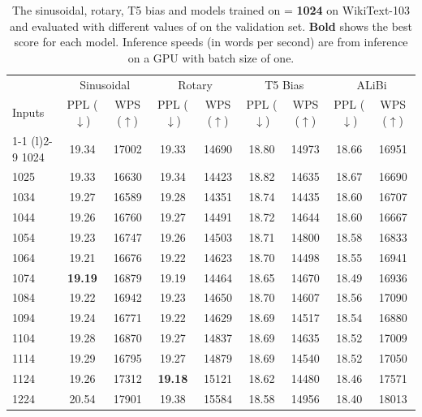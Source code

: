 \begin{table}[]
\small
\caption{The sinusoidal, rotary, T5 bias and \al models  trained on \lt = \textbf{1024} on WikiText-103 and evaluated with different values of \li on the validation set. \textbf{Bold} shows the best score for each model. Inference speeds (in words per second) are from inference on a GPU with batch size of one.}
\label{tab:appendix:wt103_extra_1024}
\begin{center}

\begin{tabular}{@{}lcccccccc@{}} \toprule
 &  \multicolumn{2}{c}{Sinusoidal} & \multicolumn{2}{c}{Rotary} &\multicolumn{2}{c}{T5 Bias} & \multicolumn{2}{c}{ALiBi} \\
Inputs & PPL ($\downarrow$) & WPS ($\uparrow$)& PPL ($\downarrow$) & WPS ($\uparrow$)& PPL ($\downarrow$) & WPS ($\uparrow$)& PPL ($\downarrow$) & WPS ($\uparrow$) \\ \cmidrule(r){1-1} \cmidrule(l){2-9}
1024   & 19.34      & 17002 & 19.33  & 14690 & 18.80   & 14973 & 18.66 & 16951 \\
1025   & 19.33      & 16630 & 19.34  & 14423 & 18.82   & 14635 & 18.67 & 16690 \\
1034   & 19.27      & 16589 & 19.28  & 14351 & 18.74   & 14435 & 18.60 & 16707 \\
1044   & 19.26      & 16760 & 19.27  & 14491 & 18.72   & 14644 & 18.60 & 16667 \\
1054   & 19.23      & 16747 & 19.26  & 14503 & 18.71   & 14800 & 18.58 & 16833 \\
1064   & 19.21      & 16676 & 19.22  & 14623 & 18.70   & 14498 & 18.55 & 16941 \\
1074   &\textbf{ 19.19}      & 16879 & 19.19  & 14464 & 18.65   & 14670 & 18.49 & 16936 \\
1084   & 19.22      & 16942 & 19.23  & 14650 & 18.70   & 14607 & 18.56 & 17090 \\
1094   & 19.24      & 16771 & 19.22  & 14629 & 18.69   & 14517 & 18.54 & 16880 \\
1104   & 19.28      & 16870 & 19.27  & 14837 & 18.69   & 14635 & 18.52 & 17009 \\
1114   & 19.29      & 16795 & 19.27  & 14879 & 18.69   & 14540 & 18.52 & 17050 \\
1124   & 19.26      & 17312 & \textbf{19.18}  & 15121 & 18.62   & 14480 & 18.46 & 17571 \\
1224   & 20.54      & 17901 & 19.38  & 15584 & 18.58   & 14956 & 18.40 & 18013 \\

\end{tabular}
\end{center}
\end{table}
